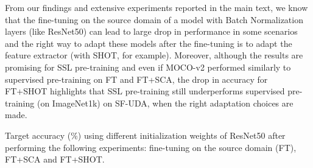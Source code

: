 \documentclass{article}
\begin{document}
From our findings and extensive experiments reported in the main text, we know that the fine-tuning on the source domain of a model with Batch Normalization layers (like ResNet50) can lead to large  drop in performance in some scenarios and the right way to adapt these models after the fine-tuning is to adapt the feature extractor (with SHOT, for example). 
Moreover, although the results are promising for SSL pre-training and even if MOCO-v2 performed similarly to supervised pre-training on FT and FT+SCA, the drop in accuracy for  FT+SHOT highlights that SSL pre-training still underperforms supervised pre-training (on ImageNet1k) on SF-UDA, when the right adaptation choices are made.

\begin{table}[h!]
\begin{center}

\caption{Target accuracy (\%) using different initialization weights of ResNet50 after performing the following experiments: fine-tuning on the source domain (FT), FT+SCA and FT+SHOT.}
\vspace{0.5cm}
\label{tab:ssl}


\end{center}
\end{table}
\end{document}
